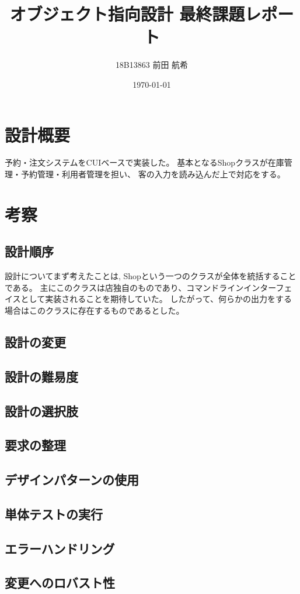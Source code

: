 \documentclass[a4paper,11pt]{jsarticle}
\begin{document}
\title{オブジェクト指向設計 最終課題レポート}
\author{18B13863 前田 航希}
\date{\today}
\maketitle

\newpage
\tableofcontents
\newpage

\section{設計概要}

予約・注文システムをCUIベースで実装した。
基本となるShopクラスが在庫管理・予約管理・利用者管理を担い、
客の入力を読み込んだ上で対応をする。

\section{考察}
\subsection{設計順序}

設計についてまず考えたことは, Shopという一つのクラスが全体を統括することである。
主にこのクラスは店独自のものであり、コマンドラインインターフェイスとして実装されることを期待していた。
したがって、何らかの出力をする場合はこのクラスに存在するものであるとした。


\subsection{設計の変更}
\subsection{設計の難易度}
\subsection{設計の選択肢}
\subsection{要求の整理}
\subsection{デザインパターンの使用}
\subsection{単体テストの実行}
\subsection{エラーハンドリング}
\subsection{変更へのロバスト性}
\end{document}
